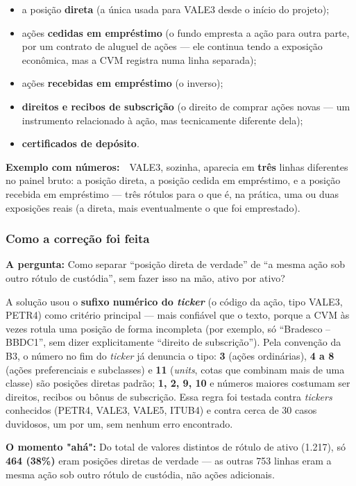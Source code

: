 \documentclass[11pt,a4paper]{article}
\newcommand{\pergunta}[1]{\par\vspace{4pt}\noindent\textbf{\color{azul}A pergunta:} #1\par\vspace{2pt}}
\newcommand{\exemplo}[0]{\par\vspace{4pt}\noindent\textbf{\color{vermelho}Exemplo com números:}\ }
\newcommand{\aha}[1]{\par\vspace{4pt}\noindent\textbf{\color{vermelho}O momento "ahá":} #1\par\vspace{2pt}}
\begin{document}
\begin{itemize}[topsep=2pt,itemsep=2pt]
\item a posição \textbf{direta} (a única usada para VALE3 desde o início do projeto);
\item ações \textbf{cedidas em empréstimo} (o fundo empresta a ação para outra parte, por um
contrato de aluguel de ações --- ele continua tendo a exposição econômica, mas a CVM registra
numa linha separada);
\item ações \textbf{recebidas em empréstimo} (o inverso);
\item \textbf{direitos e recibos de subscrição} (o direito de comprar ações novas --- um
instrumento relacionado à ação, mas tecnicamente diferente dela);
\item \textbf{certificados de depósito}.
\end{itemize}

\exemplo\ VALE3, sozinha, aparecia em \textbf{três} linhas diferentes no painel bruto: a posição
direta, a posição cedida em empréstimo, e a posição recebida em empréstimo --- três rótulos para
o que é, na prática, uma ou duas exposições reais (a direta, mais eventualmente o que foi
emprestado).

\subsubsection*{Como a correção foi feita}

\pergunta{Como separar ``posição direta de verdade'' de ``a mesma ação sob outro rótulo de
custódia'', sem fazer isso na mão, ativo por ativo?}

A solução usou o \textbf{sufixo numérico do \emph{ticker}} (o código da ação, tipo VALE3, PETR4)
como critério principal --- mais confiável que o texto, porque a CVM às vezes rotula uma posição
de forma incompleta (por exemplo, só ``Bradesco -- BBDC1'', sem dizer explicitamente ``direito de
subscrição''). Pela convenção da B3, o número no fim do \emph{ticker} já denuncia o tipo:
\textbf{3} (ações ordinárias), \textbf{4 a 8} (ações preferenciais e subclasses) e \textbf{11}
(\emph{units}, cotas que combinam mais de uma classe) são posições diretas padrão; \textbf{1, 2, 9,
10} e números maiores costumam ser direitos, recibos ou bônus de subscrição. Essa regra foi
testada contra \emph{tickers} conhecidos (PETR4, VALE3, VALE5, ITUB4) e contra cerca de 30 casos
duvidosos, um por um, sem nenhum erro encontrado.

\aha{Do total de valores distintos de rótulo de ativo (1.217), só \textbf{464 (38\%)} eram
posições diretas de verdade --- as outras 753 linhas eram a mesma ação sob outro rótulo de
custódia, não ações adicionais.}
\end{document}
